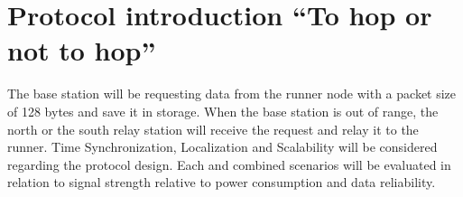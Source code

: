 \section{Protocol introduction “To hop or not to hop”}\label{sc:protocolIntroduction}
The base station will be requesting data from the runner node with a packet size of 128 bytes and save it in storage. When the base station is out of range, the north or the south relay station will receive the request and relay it to the runner. Time Synchronization, Localization and Scalability will be considered regarding the protocol design. Each and combined scenarios will be evaluated in relation to signal strength relative to power consumption and data reliability.
